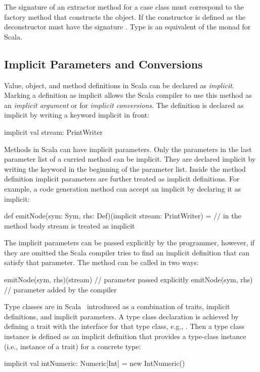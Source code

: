 The signature of an extractor method for a case class must correspond to the factory method that
 constructs the object. If the constructor is defined as 
 the deconstructor must have the signature . Type 
 is an equivalent of the  monad for Scala.


\subsection{Implicit Parameters and Conversions}

Value, object, and method definitions in Scala can be declared as \emph{implicit}. Marking a
definition as implicit allows the Scala compiler to use this method as an \emph{implicit argument} or
for \emph{implicit conversions}. The definition is declared as implicit by writing a keyword implicit in
front:\begin{lstparagraph}
implicit val stream: PrintWriter
\end{lstparagraph}

Methods in Scala can have implicit parameters. Only the parameters in the last parameter list of a curried method
can be implicit. They are declared implicit by writing the keyword  in the beginning
of the parameter list. Inside the method definition implicit parameters are further treated as implicit
definitions. For example, a code generation method can accept an implicit  by declaring it as implicit:\begin{lstparagraph}
def emitNode(sym: Sym, rhs: Def)(implicit stream: PrintWriter) = {
// in the method body stream is treated as implicit
}
\end{lstparagraph}

The implicit parameters can be passed explicitly by the programmer, however,
 if they are omitted the Scala compiler tries to find an implicit definition
 that can satisfy that parameter. The  method can be called in two ways:\begin{lstparagraph}
emitNode(sym, rhs)(stream) // parameter passed explicitly
emitNode(sym, rhs)         // parameter added by the compiler
 \end{lstparagraph}

 Type classes are in Scala~\cite{oliveira_type_2010} introduced
 as a combination of traits, implicit definitions, and implicit parameters. A type class declaration
 is achieved by defining a trait with the interface for that type class, e.g., . Then a type class
 instance is defined as an implicit definition that provides a type-class instance (i.e., instance of
 a trait) for a concrete type:\begin{lstparagraph}
implicit val intNumeric: Numeric[Int] = new IntNumeric()
 \end{lstparagraph}

